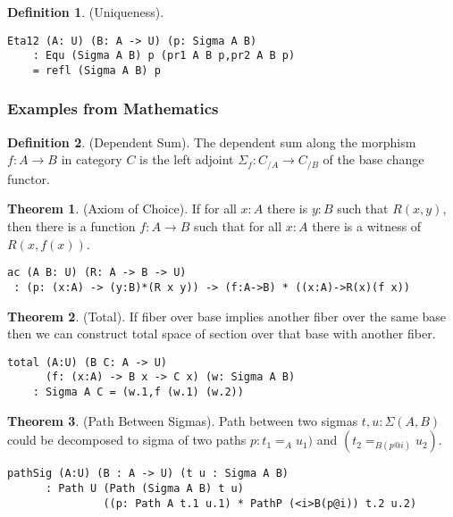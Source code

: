 \documentclass{article}
\theoremstyle{definition}
\newtheorem{definition}{Definition}
\newtheorem{theorem}{Theorem}
\begin{document}
\begin{definition} (Uniqueness).
\begin{lstlisting}
Eta12 (A: U) (B: A -> U) (p: Sigma A B)
    : Equ (Sigma A B) p (pr1 A B p,pr2 A B p)
    = refl (Sigma A B) p
\end{lstlisting}
\end{definition}

\subsubsection*{Examples from Mathematics}

\begin{definition} (Dependent Sum).
The dependent sum along the morphism $f: A \rightarrow B$ in category $C$ is the left
adjoint $\Sigma_f : C_{/A} \rightarrow C_{/B}$ of the base change functor.
\end{definition}

\begin{theorem} (Axiom of Choice).
If for all $x : A$ there is $y : B$ such that $R(x,y)$,
then there is a function $f : A \rightarrow B$
such that for all $x : A$ there is a witness of $R(x,f(x))$.
\begin{lstlisting}
ac (A B: U) (R: A -> B -> U)
 : (p: (x:A) -> (y:B)*(R x y)) -> (f:A->B) * ((x:A)->R(x)(f x))
\end{lstlisting}
\end{theorem}

\begin{theorem} (Total).
If fiber over base implies another fiber
over the same base then we can construct total space of section
over that base with another fiber.
\begin{lstlisting}
total (A:U) (B C: A -> U)
      (f: (x:A) -> B x -> C x) (w: Sigma A B)
    : Sigma A C = (w.1,f (w.1) (w.2))
\end{lstlisting}
\end{theorem}

\begin{theorem} (Path Between Sigmas).
Path between two sigmas $t,u: \Sigma(A,B)$ could be decomposed to
sigma of two paths $p:t_1=_{A}u_1)$ and $(t_2=_{B(p@i)}u_2)$.
\begin{lstlisting}
pathSig (A:U) (B : A -> U) (t u : Sigma A B)
      : Path U (Path (Sigma A B) t u)
               ((p: Path A t.1 u.1) * PathP (<i>B(p@i)) t.2 u.2)
\end{lstlisting}
\end{theorem}
\end{document}
